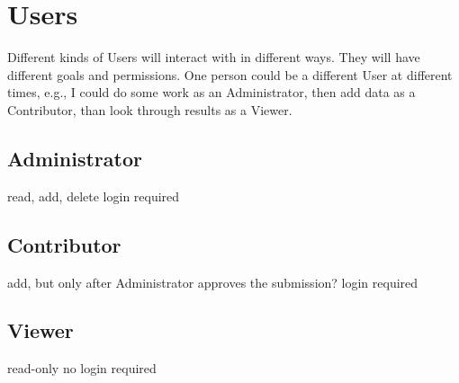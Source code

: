 \section{Users}

Different kinds of Users will interact with \phycomb in different ways.
They will have different goals and permissions.
One person could be a different User at different times, e.g., I could do some work as an Administrator, then add data as a Contributor, than look through results as a Viewer.

\subsection{Administrator}

read, add, delete
login required

\subsection{Contributor}

add, but only after Administrator approves the submission?
login required

\subsection{Viewer}

read-only
no login required
